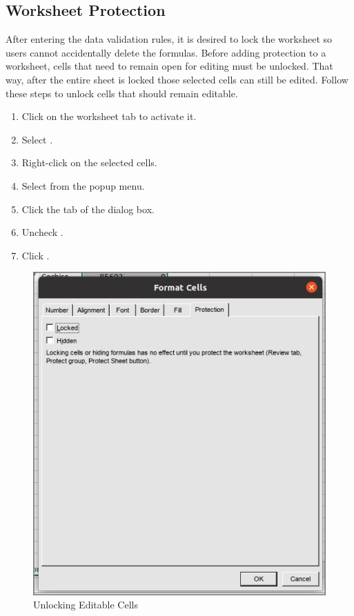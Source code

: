 \subsection{Worksheet Protection}

After entering the data validation rules, it is desired to lock the  worksheet so users cannot accidentally delete the formulas. Before adding protection to a worksheet, cells that need to remain open for editing must be unlocked. That way, after the entire sheet is locked those selected cells can still be edited. Follow these steps to unlock cells that should remain editable. 

\begin{enumerate}
	\item Click on the  worksheet tab to activate it.
	\item Select . 
	\item Right-click on the selected cells.
	\item Select  from the popup menu.
	\item Click the  tab of the dialog box.
	\item Uncheck .
	\item Click .
\end{enumerate}

\begin{figure}[H]
	\centering
	\includegraphics[width=\maxwidth{.95\linewidth}]{gfx/ch07_fig44}
	\caption{Unlocking Editable Cells}
	\label{07:fig44}
\end{figure}

